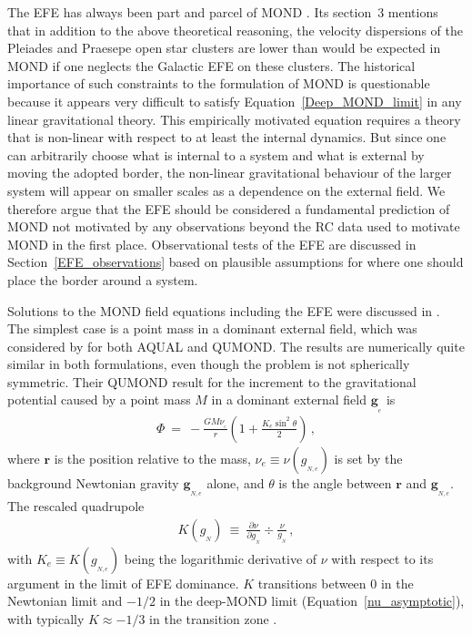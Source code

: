 \documentclass[fleqn,usenatbib,useAMS,onecolumn]{mnras} %
\begin{document}
The EFE has always been part and parcel of MOND \citep{Milgrom_1983}. Its section~3 mentions that in addition to the above theoretical reasoning, the velocity dispersions of the Pleiades \citep{Jones_1970} and Praesepe \citep{Jones_1971} open star clusters are lower than would be expected in MOND if one neglects the Galactic EFE on these clusters. The historical importance of such constraints to the formulation of MOND is questionable because it appears very difficult to satisfy Equation~\ref{Deep_MOND_limit} in any linear gravitational theory. This empirically motivated equation requires a theory that is non-linear with respect to at least the internal dynamics. But since one can arbitrarily choose what is internal to a system and what is external by moving the adopted border, the non-linear gravitational behaviour of the larger system will appear on smaller scales as a dependence on the external field. We therefore argue that the EFE should be considered a fundamental prediction of MOND not motivated by any observations beyond the RC data used to motivate MOND in the first place. Observational tests of the EFE are discussed in Section~\ref{EFE_observations} based on plausible assumptions for where one should place the border around a system.

Solutions to the MOND field equations including the EFE were discussed in \citet{Milgrom_1986}. The simplest case is a point mass in a dominant external field, which was considered by \citet{Banik_2018_EFE} for both AQUAL and QUMOND. The results are numerically quite similar in both formulations, even though the problem is not spherically symmetric. Their QUMOND result for the increment to the gravitational potential caused by a point mass $M$ in a dominant external field $\bm{g}_{_e}$ is
\begin{eqnarray}
	\Phi ~=~ -\frac{GM\nu_{_e}}{r} \left( 1 + \frac{K_e \sin^2 \theta}{2} \right) \, ,
	\label{Point_mass_EFE_QUMOND}
\end{eqnarray}
where $\bm{r}$ is the position relative to the mass, $\nu_e \equiv \nu \left( g_{_{N,e}} \right)$ is set by the background Newtonian gravity $\bm{g}_{_{N,e}}$ alone, and $\theta$ is the angle between $\bm{r}$ and $\bm{g}_{_{N,e}}$. The rescaled quadrupole
\begin{eqnarray}
	K \left( g_{_N} \right) ~\equiv~ \frac{\partial \nu}{\partial g_{_N}} \div \frac{\nu}{g_{_N}} \, ,
	\label{K_def}
\end{eqnarray}
with $K_e \equiv K \left( g_{_{N,e}} \right)$ being the logarithmic derivative of $\nu$ with respect to its argument in the limit of EFE dominance. $K$ transitions between 0 in the Newtonian limit and $-1/2$ in the deep-MOND limit (Equation~\ref{nu_asymptotic}), with typically $K \approx -1/3$ in the transition zone \citep[$K \approx -0.26$ in the Solar neighbourhood where $g_{_{N,e}} = 1.2 \, a_{_0}$; see section~3.6 of][]{Banik_2018_Centauri}.
\end{document}
